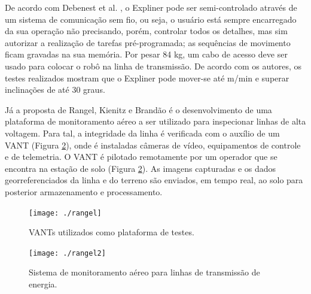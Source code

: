 De acordo com Debenest et al. \cite{debenest2008expliner}, o Expliner pode ser semi-controlado através de um sistema de comunicação sem fio, ou seja, o usuário está sempre encarregado da sua operação não precisando, porém, controlar todos os detalhes, mas sim autorizar a realização de tarefas pré-programada; as sequências de movimento ficam gravadas na sua memória. Por pesar 84 kg, um cabo de acesso deve ser usado para colocar o robô na linha de transmissão.  De acordo com os autores, os testes realizados mostram que o Expliner pode mover-se até m/min e superar inclinações de até 30 graus. 

Já a proposta de Rangel, Kienitz e Brandão \cite{rangel2009sistema} é o desenvolvimento de uma plataforma de monitoramento aéreo a ser utilizado para inspecionar linhas de alta voltagem. Para tal, a integridade da linha é verificada com o auxílio de um VANT (Figura \ref{img:rangel2}), onde é instaladas câmeras de vídeo, equipamentos de controle e de telemetria. O VANT é pilotado remotamente por um operador que se encontra na estação de solo (Figura \ref{img:rangel2}). As imagens capturadas e os dados georreferenciados da linha e do terreno são enviados, em tempo real, ao solo para posterior armazenamento e processamento.

\begin{figure} [h!]	
	\caption{VANTs utilizados como plataforma de testes.}
	\label{img:rangel1}											 
	\centering													 
	\texttt{[image: ./rangel]}
\end{figure}													 

\begin{figure} [h!]	
	\caption{Sistema de monitoramento aéreo para linhas de transmissão de energia.}
	\label{img:rangel2}											 
	\centering													 
	\texttt{[image: ./rangel2]}
\end{figure}													 

